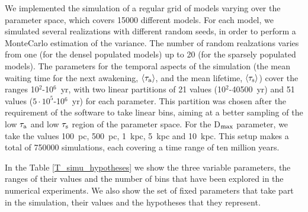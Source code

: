\documentclass[crop]{CSLB}
\newcommand{\ttn}[1]{}
\begin{document}
We implemented the simulation of a regular grid of models varying over
the parameter space, which covers 15000 different models.
%
For each model, we simulated several realizations with different random
seeds, in order to perform a MonteCarlo estimation of the variance.
%
The number of random realzations varies from one (for the densel populated models)
up to 20 (for the sparsely populated models).
%
The parameters for the temporal aspects of the simulation (the mean
waiting time for the next awakening, $\left<\tau_{\rm a}\right>$, and the
mean lifetime, $\left<\tau_{\rm s}\right>$) cover the ranges
10$^2$-10$^6$~yr, with 
two linear partitions of 21 values (10$^2$-40500~yr) and 51 values
($5\cdot10^5$-10$^6$~yr)
for each parameter.
%
This partition was chosen after the requirement of the software to take linear bins, 
aiming at a better sampling of the low $\tau_{\rm a}$ and low
$\tau_{\rm s}$ region of the parameter space.
%
For the D$_{\rm max}$ parameter, we take the 
values 100~pc, 500~pc, 1~kpc, 5~kpc and 10~kpc.
%
This setup makes a total of 750000 simulations, each covering a time
range of ten million years.
%
\ttn{1}
%
In the Table \ref{T_simu_hypotheses} we show the three variable
parameters, the ranges of their values and the number of bins that
have been explored in the numerical experiments.
%
We also show the set of fixed parameters that take part in the simulation,
their values and the hypotheses that they represent.
\end{document}
